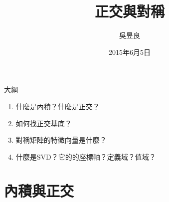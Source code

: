 \documentclass[14pt]{beamer}
\title{正交與對稱}
\subtitle{}
\date{2015年6月5日}
\author{吳昱良}
\institute{交通大學電機工程學系108級}
\begin{document}
\maketitle

\begin{frame}{大綱}
\begin{enumerate}
	\item 什麼是內積？什麼是正交？
	\item 如何找正交基底？
	\item 對稱矩陣的特徵向量是什麼？
	\item 什麼是SVD？它的的座標軸？定義域？值域？

\end{enumerate}

\end{frame}

\section{內積與正交}
\end{document}
